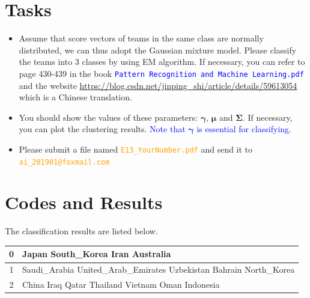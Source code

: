 ﻿\documentclass[a4paper, 11pt]{article}
\numberwithin{equation}{subsection}
\begin{document}
\section{Tasks}
\begin{itemize}
	\item Assume that score vectors of teams in the same class are normally distributed, we can thus adopt the Gaussian mixture model. Please classify the teams into 3 classes by using EM algorithm. If necessary, you can refer to page 430-439 in the book \textcolor{blue}{\texttt{Pattern Recognition and Machine Learning.pdf}} and the website \textcolor{	orange}{\url{https://blog.csdn.net/jinping_shi/article/details/59613054}} which is a Chinese translation.
	\item You should show the values of these parameters: $\boldsymbol\gamma$, $\boldsymbol\mu$ and $\boldsymbol\Sigma$. If necessary, you can plot the clustering results. \textcolor{blue}{Note that $\boldsymbol\gamma$ is essential for classifying.}
	\item Please submit a file named \textcolor{orange}{\texttt{E13\_YourNumber.pdf}} and send it to \textcolor{orange}{\texttt{ai\_201901@foxmail.com}}
\end{itemize}

\section{Codes and Results}

The classification results are listed below.
\begin{center}
\begin{tabular}{|c|l|}\hline
0 & Japan South\_Korea Iran Australia\\\hline
1 & Saudi\_Arabia United\_Arab\_Emirates Uzbekistan Bahrain North\_Korea\\\hline
2 & China Iraq Qatar Thailand Vietnam Oman Indonesia\\\hline
\end{tabular}
\end{center}
\end{document}
